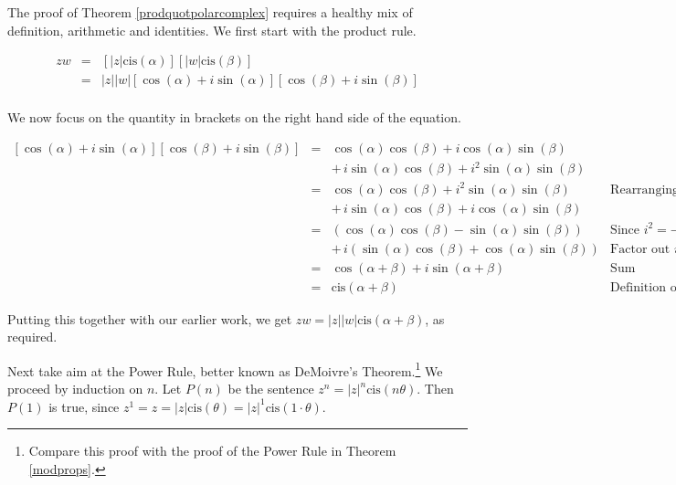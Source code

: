 \documentclass{ximera}
\begin{document}
\medskip

The proof of Theorem \ref{prodquotpolarcomplex} requires a healthy mix of definition, arithmetic and identities.  We first start with the product rule.

\[ \begin{array}{rcl}

zw & = & \left[|z|\text{cis}(\alpha)\right] \left[|w|\text{cis}(\beta)\right]  \\[3pt]
   & = & |z||w|\left[\cos(\alpha) + i\sin(\alpha)\right]\left[\cos(\beta) + i \sin(\beta)\right] \\ \end{array} \]

We now focus on the quantity in brackets on the right hand side of the equation.

\[ \begin{array}{rcll}

\left[\cos(\alpha) + i\sin(\alpha)\right]\left[\cos(\beta) + i \sin(\beta)\right] & = & \cos(\alpha)\cos(\beta) + i\cos(\alpha)\sin(\beta) & \\
																																									&  & + \, i\sin(\alpha)\cos(\beta) + i^2 \sin(\alpha) \sin(\beta) & \\[3pt]
																																									& = & \cos(\alpha)\cos(\beta) +  i^2 \sin(\alpha) \sin(\beta)& \text{Rearranging terms} \\
																																									&  & + \, i\sin(\alpha)\cos(\beta) +i\cos(\alpha)\sin(\beta)  & \\[3pt]
																																									& = & \left(\cos(\alpha)\cos(\beta) - \sin(\alpha) \sin(\beta)\right) & \text{Since $i^2 = -1$}\\
																																									&  & + \, i\left(\sin(\alpha)\cos(\beta)+ \cos(\alpha)\sin(\beta)\right) & \text{Factor out $i$}\\[3pt] 
																																									& = & \cos(\alpha + \beta) + i \sin(\alpha+\beta) & \text{Sum identities} \\[3pt]
																																									& = & \text{cis}(\alpha + \beta) & \text{Definition of `cis'}
\end{array} \]

Putting this together with our earlier work, we get $zw = |z| |w| \text{cis}(\alpha + \beta)$, as required.  

\smallskip

Next take aim at the Power Rule, better known  as DeMoivre's Theorem.\footnote{Compare this proof with the proof of the Power Rule in Theorem \ref{modprops}.} We proceed by induction on $n$. Let $P(n)$ be the sentence $z^{n} = |z|^{n} \text{cis}(n \theta)$.  Then $P(1)$ is true, since $z^{1} = z = |z| \text{cis}(\theta) = |z|^{1} \text{cis}(1\cdot \theta)$.  
\end{document}
